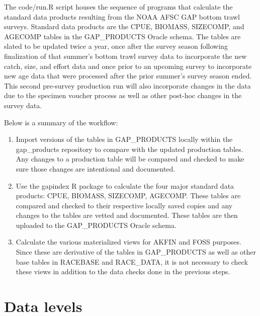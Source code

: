 \documentclass[
  letterpaper,
  oneside,
  open=any]{scrbook}
\begin{document}
The code/run.R script houses the sequence of programs that calculate the
standard data products resulting from the NOAA AFSC GAP bottom trawl
surveys. Standard data products are the CPUE, BIOMASS, SIZECOMP, and
AGECOMP tables in the GAP\_PRODUCTS Oracle schema. The tables are slated
to be updated twice a year, once after the survey season following
finalization of that summer's bottom trawl survey data to incorporate
the new catch, size, and effort data and once prior to an upcoming
survey to incorporate new age data that were processed after the prior
summer's survey season ended. This second pre-survey production run will
also incorporate changes in the data due to the specimen voucher process
as well as other post-hoc changes in the survey data.

Below is a summary of the workflow:

\begin{enumerate}
\def\labelenumi{\arabic{enumi}.}
\item
  Import versions of the tables in GAP\_PRODUCTS locally within the
  gap\_products repository to compare with the updated production
  tables. Any changes to a production table will be compared and checked
  to make sure those changes are intentional and documented.
\item
  Use the gapindex R package to calculate the four major standard data
  products: CPUE, BIOMASS, SIZECOMP, AGECOMP. These tables are compared
  and checked to their respective locally saved copies and any changes
  to the tables are vetted and documented. These tables are then
  uploaded to the GAP\_PRODUCTS Oracle schema.
\item
  Calculate the various materialized views for AKFIN and FOSS purposes.
  Since these are derivative of the tables in GAP\_PRODUCTS as well as
  other base tables in RACEBASE and RACE\_DATA, it is not necessary to
  check these views in addition to the data checks done in the previous
  steps.
\end{enumerate}

\hypertarget{data-levels}{%
\section{Data levels}\label{data-levels}}
\end{document}
